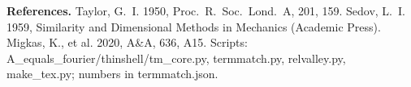 \documentclass[10pt]{article}
\begin{document}
{{\footnotesize\textbf{References.} Taylor, G.~I. 1950, Proc.\ R.\ Soc.\ Lond.\ A, 201, 159. Sedov, L.~I. 1959, Similarity and Dimensional Methods in Mechanics (Academic Press). Migkas, K., et al. 2020, A\&A, 636, A15. Scripts: A\_equals\_fourier/thinshell/tm\_core.py, termmatch.py, relvalley.py, make\_tex.py; numbers in termmatch.json.}
}
\end{document}
